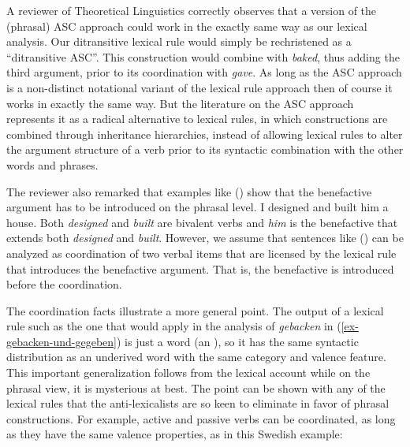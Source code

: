
A reviewer of Theoretical Linguistics correctly observes that a version of the (phrasal) ASC approach could work in the exactly same way as our lexical analysis.  
Our ditransitive lexical rule would simply be rechristened as a ``ditransitive ASC''.  This construction would combine with \emph{baked}, thus adding the
third argument, prior to its coordination with \emph{gave}.  As long as the ASC approach is a non-distinct notational
variant of the lexical rule approach then of course it works in exactly the same way.  But the literature on the ASC approach represents
it as a radical alternative to lexical rules, in which constructions are combined through inheritance hierarchies, instead of allowing lexical rules 
to alter the argument structure of a verb prior to its syntactic combination with the other words and phrases.  

The reviewer also remarked that examples like () show that the benefactive argument has to be
introduced on the phrasal level.
\ea
I designed and built him a house.
\z
Both \emph{designed} and \emph{built} are bivalent verbs and \emph{him} is the benefactive that
extends both \emph{designed} and \emph{built}. However, we assume that sentences like () can
be analyzed as coordination of two verbal items that are licensed by the lexical rule that
introduces the benefactive argument. That is, the benefactive is introduced before the coordination.

The coordination facts illustrate a more general point.  The output of a lexical rule such as the one that would
apply in the analysis of \emph{gebacken} in (\ref{ex-gebacken-und-gegeben}) is just a word (an
\xzero), so it has the same syntactic distribution as an underived word with the same category and
valence feature.  This important generalization follows from the lexical account while on the
phrasal view, it is mysterious at best.  The point can be shown with any of the lexical rules that
the anti-lexicalists are so keen to eliminate in favor of phrasal constructions.  For example,
active and passive verbs can be coordinated, as long as they have the same valence properties, as in
this Swedish example: 

